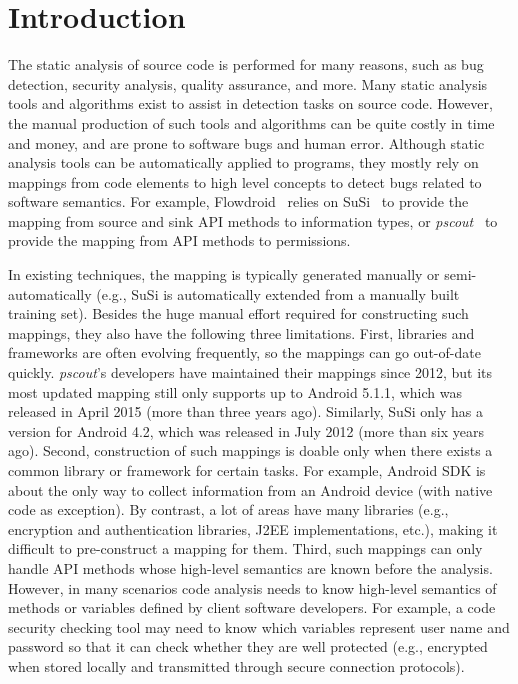 \section{Introduction}

The static analysis of source code is performed for many reasons, such as bug detection, security analysis, quality assurance, and more. Many static analysis tools and algorithms exist to assist in detection tasks on source code. However, the manual production of such tools and algorithms can be quite costly in time and money, and are prone to software bugs and human error. Although static analysis tools can be automatically applied to programs, they mostly rely on mappings from code elements to high level concepts to detect bugs related to software semantics. For example, Flowdroid~\cite{arzt2014flowdroid} relies on SuSi~\cite{rasthofer2014machine} to provide the mapping from source and sink API methods to information types, or \textit{pscout}~\cite{au2012pscout} to provide the mapping from API methods to permissions. 


In existing techniques, the mapping is typically generated manually or semi-automatically (e.g., SuSi is automatically extended from a manually built training set). Besides the huge manual effort required for constructing such mappings, they also have the following three limitations. First, libraries and frameworks are often evolving frequently, so the mappings can go out-of-date quickly. \textit{pscout}'s developers have maintained their mappings since 2012, but its most updated mapping still only supports up to Android 5.1.1, which was released in April 2015 (more than three years ago). Similarly, SuSi only has a version for Android 4.2, which was released in July 2012 (more than six years ago). Second, construction of such mappings is doable only when there exists a common library or framework for certain tasks. For example, Android SDK is about the only way to collect information from an Android device (with native code as exception). By contrast, a lot of areas have many libraries (e.g., encryption and authentication libraries, J2EE implementations, etc.), making it difficult to pre-construct a mapping for them. Third, such mappings can only handle API methods whose high-level semantics are known before the analysis. However, in many scenarios code analysis needs to know high-level semantics of methods or variables defined by client software developers. For example, a code security checking tool may need to know which variables represent user name and password so that it can check whether they are well protected (e.g., encrypted when stored locally and transmitted through secure connection protocols).

